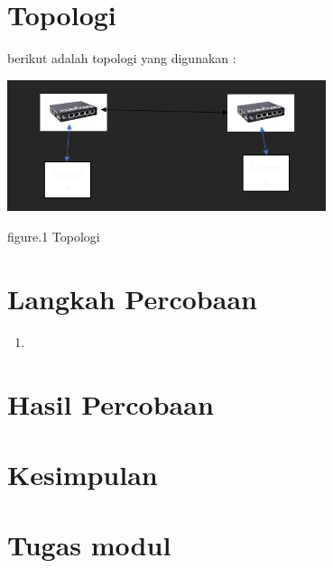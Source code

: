 \section{Topologi}

berikut adalah topologi yang digunakan :

\begin{center}
    \includegraphics[width=0.7\textwidth]{image/P5/Topologi.png}    
    
    figure.1 Topologi
\end{center}


\section{Langkah Percobaan}
\begin{enumerate}
    \item 
\end{enumerate}

\section{Hasil Percobaan}


\section{Kesimpulan}


\section{Tugas modul}
